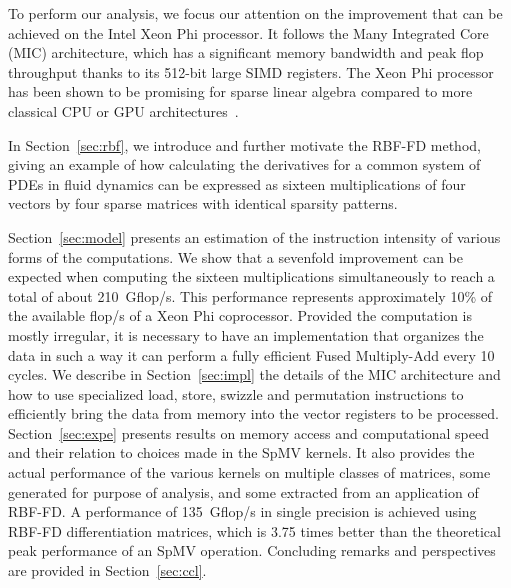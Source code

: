 \documentclass{sig-alternate}
\def\ee#1{{#1}}
\def\ge#1{{#1}}
\def\NOTE#1{{}}
\begin{document}
To perform our analysis, we focus our attention on the improvement
that can be achieved on the Intel Xeon Phi processor. It follows the
Many Integrated Core (MIC) architecture, which has a significant
memory bandwidth and peak flop throughput thanks to its 512-bit large
SIMD registers. The Xeon Phi processor has been shown to be promising
for sparse linear algebra compared to more classical CPU or GPU
architectures~\cite{Saule13-ARXIV, Liu:2013:ESM:2464996.2465013, cramer2012openmp}.

In Section~\ref{sec:rbf}, we introduce and further motivate the RBF-FD method, giving 
an example of how calculating the derivatives for a common system of PDEs in fluid dynamics 
can be expressed as sixteen multiplications of four vectors by four sparse matrices with 
identical sparsity patterns.

Section~\ref{sec:model} presents an
estimation of the instruction intensity of various forms of the
computations. We show that a \ge{sevenfold} \NOTE{sixfold was inconsistent with eighfold in the abstract.} improvement can be
expected when computing the sixteen multiplications simultaneously to
reach a total of about 210~Gflop/s. This performance represents
approximately 10\% of the available flop/s of a Xeon Phi
coprocessor. \ee{Provided the computation is mostly irregular, it is necessary to have an implementation that organizes the data in such a way it can perform a fully efficient Fused Multiply-Add every 10 cycles.} \NOTE{Rewrote, is it more clear?}
\ge{We describe in Section~\ref{sec:impl} the details of the MIC
architecture and how to use specialized load, store, swizzle and
permutation instructions to efficiently bring the data from memory into the vector
registers to be processed. Section~\ref{sec:expe} presents results on 
memory access and computational speed and their relation to choices made in the 
SpMV kernels.}
It also provides the actual performance of the various kernels on multiple classes of matrices, 
some generated for purpose of analysis, and some extracted from an application of RBF-FD. 
A performance of 135~Gflop/s in single precision is achieved using RBF-FD differentiation matrices, which is 3.75 times better than the theoretical peak performance of an SpMV operation. Concluding remarks and perspectives are provided in Section~\ref{sec:ccl}.%
\end{document}
